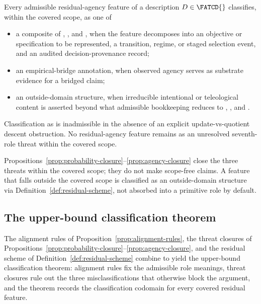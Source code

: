 \begin{proposition}\label{prop:agency-closure}
Every admissible residual-agency feature of a description
\(D \in \FATCD{}\) classifies, within the covered scope, as one of
\begin{itemize}[topsep=2pt,itemsep=1pt]
  \item a composite of \Ptwo{}, \Pfour{}, and \Psix{}, when the feature
    decomposes into an objective or specification to be represented, a
    transition, regime, or staged selection event, and an audited
    decision-provenance record;
  \item an empirical-bridge annotation, when observed agency serves as
    substrate evidence for a bridged claim;
  \item an outside-domain structure, when irreducible intentional or
    teleological content is asserted beyond what admissible
    bookkeeping reduces to \Ptwo{}, \Pfour{}, and \Psix{}.
\end{itemize}
Classification as \Pone{} is inadmissible in the absence of an explicit
update-vs-quotient descent obstruction. No residual-agency feature remains
as an unresolved seventh-role threat within the covered scope.
\end{proposition}

\begin{remark}\label{rem:threat-closures-scope}
Propositions~\ref{prop:probability-closure}--\ref{prop:agency-closure}
close the three threats within the covered scope; they do not make
scope-free claims. A feature that falls outside the covered scope is
classified as an outside-domain structure via
Definition~\ref{def:residual-scheme}, not absorbed into a primitive role
by default.
\end{remark}

\subsection{The upper-bound classification theorem}\label{subsec:classification-theorem}

The alignment rules of Proposition~\ref{prop:alignment-rules}, the
threat closures of
Propositions~\ref{prop:probability-closure}--\ref{prop:agency-closure},
and the residual scheme of Definition~\ref{def:residual-scheme}
combine to yield the upper-bound classification theorem: alignment
rules fix the admissible role meanings, threat closures rule out the
three misclassifications that otherwise block the argument, and the
theorem records the classification codomain for every covered
residual feature.

